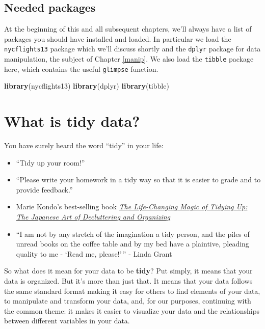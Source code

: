 \documentclass[]{tufte-book}
\newenvironment{Shaded}{\begin{snugshade}}{\end{snugshade}}
\newcommand{\KeywordTok}[1]{\textcolor[rgb]{0.13,0.29,0.53}{\textbf{{#1}}}}
\newcommand{\NormalTok}[1]{{#1}}
\providecommand{\tightlist}{%
  \setlength{\itemsep}{0pt}\setlength{\parskip}{0pt}}
\begin{document}
\subsection*{Needed packages}\label{needed-packages}

At the beginning of this and all subsequent chapters, we'll always have
a list of packages you should have installed and loaded. In particular
we load the \texttt{nycflights13} package which we'll discuss shortly
and the \texttt{dplyr} package for data manipulation, the subject of
Chapter \ref{manip}. We also load the \texttt{tibble} package here,
which contains the useful \texttt{glimpse} function.

\begin{Shaded}
\begin{Highlighting}[]
\KeywordTok{library}\NormalTok{(nycflights13)}
\KeywordTok{library}\NormalTok{(dplyr)}
\KeywordTok{library}\NormalTok{(tibble)}
\end{Highlighting}
\end{Shaded}

\section{What is tidy data?}\label{what-is-tidy-data}

You have surely heard the word ``tidy'' in your life:

\begin{itemize}
\tightlist
\item
  ``Tidy up your room!''
\item
  ``Please write your homework in a tidy way so that it is easier to
  grade and to provide feedback.''
\item
  Marie Kondo's best-selling book
  \href{https://www.amazon.com/Life-Changing-Magic-Tidying-Decluttering-Organizing/dp/1607747308/ref=sr_1_1?ie=UTF8\&qid=1469400636\&sr=8-1\&keywords=tidying+up}{\emph{The
  Life-Changing Magic of Tidying Up: The Japanese Art of Decluttering
  and Organizing}}
\item
  ``I am not by any stretch of the imagination a tidy person, and the
  piles of unread books on the coffee table and by my bed have a
  plaintive, pleading quality to me - `Read me, please!'\,'' - Linda
  Grant
\end{itemize}

So what does it mean for your data to be \textbf{tidy}? Put simply, it
means that your data is organized. But it's more than just that. It
means that your data follows the same standard format making it easy for
others to find elements of your data, to manipulate and transform your
data, and, for our purposes, continuing with the common theme: it makes
it easier to visualize your data and the relationships between different
variables in your data.
\end{document}
